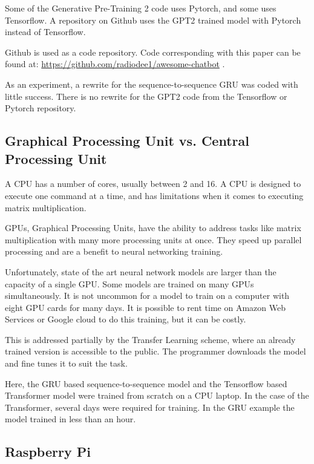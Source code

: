 Some of the Generative Pre-Training 2 code uses Pytorch, and some uses Tensorflow. A repository on Github uses the GPT2 trained model with Pytorch instead of Tensorflow.

Github is used as a code repository. Code corresponding with this paper can be found at: \href{https://github.com/radiodee1/awesome-chatbot}{https://github.com/radiodee1/awesome-chatbot} . 

As an experiment, a rewrite for the sequence-to-sequence GRU was coded with little success. There is no rewrite for the GPT2 code from the Tensorflow or Pytorch repository.

\subsection{Graphical Processing Unit vs. Central Processing Unit}

A CPU has a number of cores, usually between 2 and 16. A CPU is designed to execute one command at a time, and has limitations when it comes to executing matrix multiplication. %

GPUs, Graphical Processing Units, have the ability to address tasks like matrix multiplication with many more processing units at once. They speed up parallel processing and are a benefit to neural networking training.%

Unfortunately, state of the art neural network models are larger than the capacity of a single GPU. Some models are trained on many GPUs simultaneously. It is not uncommon for a model to train on a computer with eight GPU cards for many days. It is possible to rent time on Amazon Web Services or Google cloud to do this training, but it can be costly.

This is addressed partially by the Transfer Learning scheme, where an already trained version is accessible to the public. The programmer downloads the model and fine tunes it to suit the task.

Here, the GRU based sequence-to-sequence model and the Tensorflow based Transformer model were trained from scratch on a CPU laptop. In the case of the Transformer, several days were required for training. In the GRU example the model trained in less than an hour.

\subsection{Raspberry Pi}


